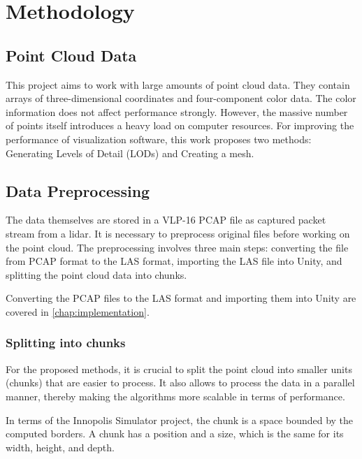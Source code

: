 \chapter{Methodology}
\label{chap:methodology}

\graphicspath{{figs/methodology/}}

\section{Point Cloud Data}
\label{sec:point_cloud_data}

This project aims to work with large amounts of point cloud data. They contain arrays of three-dimensional coordinates and four-component color data. The color information does not affect performance strongly. However, the massive number of points itself introduces a heavy load on computer resources. For improving the performance of visualization software, this work proposes two methods: Generating Levels of Detail (LODs) and Creating a mesh.


\section{Data Preprocessing}
\label{sec:data_preprocessing}

The data themselves are stored in a VLP-16 PCAP file as captured packet stream from a lidar. It is necessary to preprocess original files before working on the point cloud. The preprocessing involves three main steps: converting the file from PCAP format to the LAS format, importing the LAS file into Unity, and splitting the point cloud data into chunks.

Converting the PCAP files to the LAS format and importing them into Unity are covered in \autoref{chap:implementation}.

\subsection{Splitting into chunks}

For the proposed methods, it is crucial to split the point cloud into smaller units (chunks) that are easier to process. It also allows to process the data in a parallel manner, thereby making the algorithms more scalable in terms of performance.

In terms of the Innopolis Simulator project, the chunk is a space bounded by the computed borders. A chunk has a position and a size, which is  the same for its width, height, and depth. 

